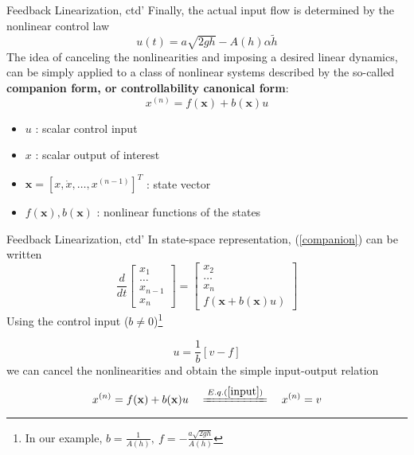 \documentclass{beamer}
\begin{document}
  \begin{frame}{Feedback Linearization, ctd'}
  Finally, the actual input flow is determined by the nonlinear control law
  $$ u(t) = a\sqrt{2gh} - A(h)\alpha \widetilde{h} $$
    The idea of canceling the nonlinearities and imposing a desired linear dynamics, can be simply applied to a class of nonlinear systems described by the so-called \textbf{companion form, or controllability canonical form}:
    \begin{equation}\label{companion}
      x^{(n)} = f(\textbf{x}) + b(\textbf{x})u
    \end{equation}
    \vspace{-15pt}
    \begin{itemize}
      \item $u$ : scalar control input
      \item $x$ : scalar output of interest
      \item $\textbf{x} = \left[ x,\dot{x},\dots,x^{(n-1)}\right]^{T}$ : state vector
      \item $f(\textbf{x}), b(\textbf{x})$ : nonlinear functions of the states
    \end{itemize}
  \end{frame}


  \begin{frame}{Feedback Linearization, ctd'}
  In state-space representation, (\ref{companion}) can be written
  $$
  \frac{d}{dt}\left[\begin{array}{c}
                      x_{1} \\
                      \dots \\
                      x_{n-1} \\
                      x_{n}
                    \end{array}\right] = \left[\begin{array}{c}
                                                 x_{2} \\
                                                 \dots \\
                                                 x_{n} \\
                                                 f(\textbf{x}+b(\textbf{x})u)
                                               \end{array}\right]
  $$
  Using the control input ($b \neq 0$)\footnote{In our example, $b=\frac{1}{A(h)}, ~ f=-\frac{a\sqrt{2gh}}{A(h)}$}

  \begin{equation}\label{input}
    u = \frac{1}{b}\left[v-f\right]
  \end{equation}
  we can cancel the nonlinearities and obtain the simple input-output relation
  $$ x^{(n)} = f(\textbf{x}) + b(\textbf{x})u \quad \xlongequal{E.q.(\ref{input})} \quad x^{(n)} = v $$
  \end{frame}
\end{document}
